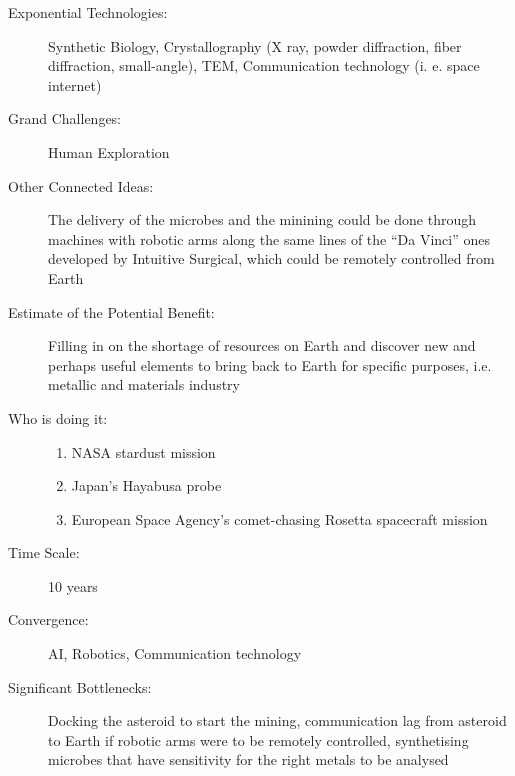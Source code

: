 \begin{description}
\item[Exponential Technologies:] Synthetic Biology, Crystallography (X ray, powder diffraction, fiber diffraction, small-angle), \gls{TEM}, Communication technology (i. e. space internet)
\item[Grand Challenges:] Human Exploration
\item[Other Connected Ideas:] The delivery of the microbes and the minining could be done through machines with robotic arms along the same lines of the ``Da Vinci'' ones developed by Intuitive Surgical, which could be remotely controlled from Earth
\item[Estimate of the Potential Benefit:] Filling in on the shortage of resources on Earth and discover new and perhaps useful elements to bring back to Earth for specific purposes, i.e. metallic and materials industry
\item[Who is doing it:]
\hfill\begin{enumerate}
\item NASA stardust mission
\item Japan's Hayabusa probe
\item European Space Agency's comet-chasing Rosetta spacecraft mission
\end{enumerate}
\item[Time Scale:] 10 years
\item[Convergence:] AI, Robotics, Communication technology
\item[Significant Bottlenecks:] Docking the asteroid to start the mining, communication lag from asteroid to Earth if robotic arms were to be remotely controlled, synthetising microbes that have sensitivity for the right metals to be analysed
 \end{description}
 
